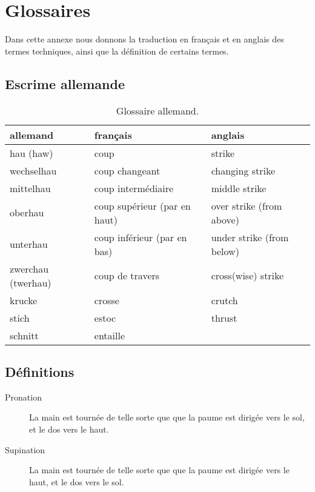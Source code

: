 \chapter{Glossaires}


Dans cette annexe nous donnons la traduction en français et en anglais des termes techniques, ainsi que la définition de certains termes.





\section{Escrime allemande}


\begin{table}[h]
	\centering
	\begin{tabular}{lll}
		allemand &
			français &
			anglais
			\\
		\hline
		hau (haw) &
			coup &
			strike
			\\
		wechselhau &
			coup changeant &
			changing strike
			\\
		mittelhau &
			coup intermédiaire &
			middle strike
			\\
		oberhau &
			coup supérieur (par en haut) &
			over strike (from above)
			\\
		unterhau &
			coup inférieur (par en bas) &
			under strike (from below)
			\\
		zwerchau (twerhau) &
			coup de travers &
			cross(wise) strike
			\\
		krucke &
			crosse &
			crutch
			\\
		stich &
			estoc &
			thrust
			\\
		schnitt &
			entaille &
	\end{tabular}
	\caption{Glossaire allemand.}
	\label{app:tab:glossaire-allemand}
\end{table}


\section{Définitions}


\begin{description}
	\item[Pronation] La main est tournée de telle sorte que que la paume est dirigée vers le sol, et le dos vers le haut.
	
	\item[Supination] La main est tournée de telle sorte que que la paume est dirigée vers le haut, et le dos vers le sol.
\end{description}

